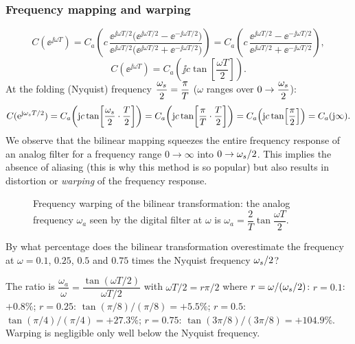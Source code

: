 \subsubsection*{Frequency mapping and warping}
\[
  C(\ee^{\jj\omega T})=C_a\!\left(c\,\frac{\ee^{\jj\omega T/2}\bigl(\ee^{\jj\omega T/2}-\ee^{-\jj\omega T/2}\bigr)}{\ee^{\jj\omega T/2}\bigl(\ee^{\jj\omega T/2}+\ee^{-\jj\omega T/2}\bigr)}\right)
  =C_a\!\left(c\,\frac{\ee^{\jj\omega T/2}-\ee^{-\jj\omega T/2}}{\ee^{\jj\omega T/2}+\ee^{-\jj\omega T/2}}\right),
\]
\[
  C(\ee^{\jj\omega T})=C_a\!\left(\jj c\tan\!\left[\frac{\omega T}{2}\right]\right).
\]
At the folding (Nyquist) frequency $\dfrac{\omega_s}{2}=\dfrac{\pi}{T}$ ($\omega$ ranges over $0\to\dfrac{\omega_s}{2}$):
\[
  C(\mathrm{e}^{\mathrm{j}\omega_s T/2})=C_a\!\left(\mathrm{j} c\tan\!\left[\frac{\omega_s}{2}\cdot\frac T2\right]\right)=C_a\!\left(\mathrm{j} c\tan\!\left[\frac\pi T\cdot\frac T2\right]\right)
  =C_a\!\left(\mathrm{j} c\tan\!\left[\frac\pi2\right]\right)=C_a(\mathrm{j}\infty).
\]
We observe that the bilinear mapping squeezes the entire frequency response of an analog filter for a frequency range
$0\to\infty$ into $0\to\omega_s/2$. This implies the absence of aliasing (this is why this method is so popular) but also
results in distortion or \emph{warping} of the frequency response.

\begin{figure}[ht]
\centering
\figWarp
\caption{Frequency warping of the bilinear transformation: the analog frequency $\omega_a$ seen by the digital filter at
$\omega$ is $\omega_a=\dfrac2T\tan\dfrac{\omega T}{2}$.}
\end{figure}

\begin{problem}
By what percentage does the bilinear transformation overestimate the frequency at $\omega=0.1$, $0.25$, $0.5$ and $0.75$ times the Nyquist frequency $\omega_s/2$?
\end{problem}
\begin{solution}
The ratio is $\dfrac{\omega_a}{\omega}=\dfrac{\tan(\omega T/2)}{\omega T/2}$ with $\omega T/2=r\pi/2$ where $r=\omega/(\omega_s/2)$:
$r=0.1$: $+0.8\%$; $r=0.25$: $\tan(\pi/8)/(\pi/8)=+5.5\%$; $r=0.5$: $\tan(\pi/4)/(\pi/4)=+27.3\%$; $r=0.75$:
$\tan(3\pi/8)/(3\pi/8)=+104.9\%$. Warping is negligible only well below the Nyquist frequency.
\end{solution}

